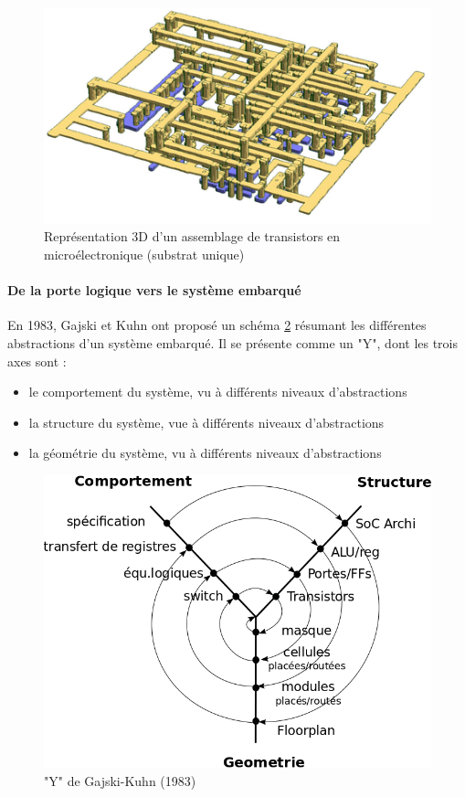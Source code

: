 \begin{figure}[htb]
  \begin{center}
    \includegraphics[scale=0.4]{figures/enchevetrement.png}
    \caption{Représentation 3D d'un assemblage de transistors en microélectronique (substrat unique)}
    \label{cmos4}
  \end{center}
\end{figure}

\paragraph{De la porte logique vers le système embarqué}

En 1983, Gajski et Kuhn ont proposé un schéma \ref{gajski} résumant les différentes abstractions d'un système embarqué. Il se présente comme un "Y", dont les trois axes sont :
\begin{itemize}
  \item le comportement du système, vu à différents niveaux d'abstractions
  \item la structure du système, vue à différents niveaux d'abstractions
  \item la géométrie du système, vu à différents niveaux d'abstractions
\end{itemize}

\begin{figure}[htb]
  \begin{center}
  \includegraphics[scale=0.4]{figures/ychart.png}
  \caption{"Y" de Gajski-Kuhn (1983)}
  \label{gajski}
  \end{center}
\end{figure}

